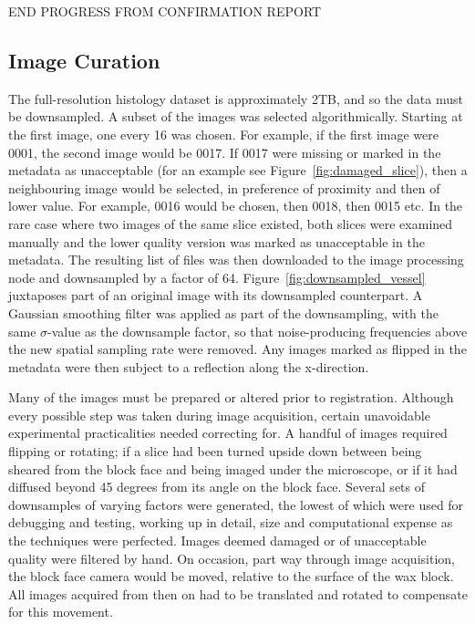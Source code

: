 END PROGRESS FROM CONFIRMATION REPORT 
  
  \subsection{Image Curation} %
  \label{sub:image_curation}
    
    The full-resolution histology dataset is approximately 2TB, and so the data must be downsampled. A subset of the images was selected algorithmically. Starting at the first image, one every 16 was chosen. For example, if the first image were 0001, the second image would be 0017. If 0017 were missing or marked in the metadata as unacceptable (for an example see Figure~\ref{fig:damaged_slice}), then a neighbouring image would be selected, in preference of proximity and then of lower value. For example, 0016 would be chosen, then 0018, then 0015 etc. In the rare case where two images of the same slice existed, both slices were examined manually and the lower quality version was marked as unacceptable in the metadata. The resulting list of files was then downloaded to the image processing node and downsampled by a factor of 64. Figure~\ref{fig:downsampled_vessel} juxtaposes part of an original image with its downsampled counterpart. A Gaussian smoothing filter was applied as part of the downsampling, with the same $\sigma$-value as the downsample factor, so that noise-producing frequencies above the new spatial sampling rate were removed. Any images marked as flipped in the metadata were then subject to a reflection along the x-direction.
    
      Many of the images must be prepared or altered prior to registration. Although every possible step was taken during image acquisition, certain unavoidable experimental practicalities needed correcting for. A handful of images required flipping or rotating; if a slice had been turned upside down between being sheared from the block face and being imaged under the microscope, or if it had diffused beyond 45 degrees from its angle on the block face. Several sets of downsamples of varying factors were generated, the lowest of which were used for debugging and testing, working up in detail, size and computational expense as the techniques were perfected. Images deemed damaged or of unacceptable quality were filtered by hand. On occasion, part way through image acquisition, the block face camera would be moved, relative to the surface of the wax block. All images acquired from then on had to be translated and rotated to compensate for this movement.
    

